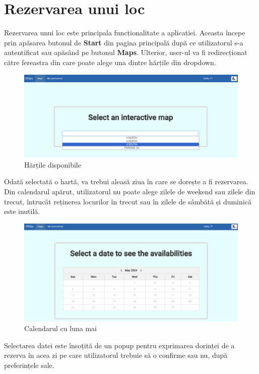 \section{Rezervarea unui loc}

Rezervarea unui loc este principala funcționalitate a aplicației. Aceasta începe prin apăsarea butonul de \textbf{Start} din pagina principală după ce utilizatorul s-a autentificat sau apăsând pe butonul \textbf{Maps}. Ulterior, user-ul va fi redirecționat către fereastra din care poate alege una dintre hărțile din dropdown. 

\newpage

\begin{figure}[!htb]
    \centering
    \includegraphics[width=0.9\linewidth]{images/harti.png}
    \caption{Hărțile disponibile}
    \label{fig:harti}
\end{figure}

Odată selectată o hartă, va trebui aleasă ziua în care se dorește a fi rezervarea. Din calendarul apărut, utilizatorul nu poate alege zilele de weekend sau zilele din trecut, întrucât reținerea locurilor în trecut sau în zilele de sâmbătă și duminică este inutilă.  

\begin{figure}[!htb]
    \centering
    \includegraphics[width=0.9\linewidth]{images/calendar vechi.png}
    \caption{Calendarul cu luna mai}
    \label{fig:calendarvechi}
\end{figure}

Selectarea datei este însoțită de un popup pentru exprimarea dorinței de a rezerva în acea zi pe care utilizatorul trebuie să o confirme sau nu, după preferințele sale.


